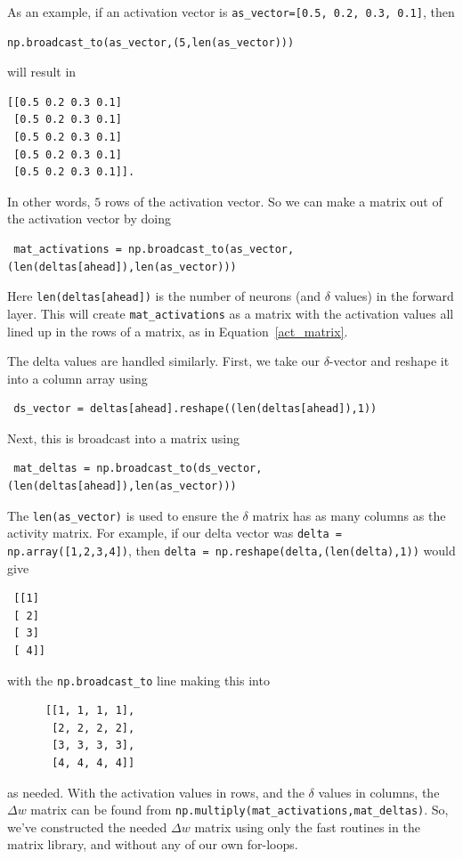 \documentclass[12pt]{article}
\begin{document}
As an example, if an activation vector is \verb|as_vector=[0.5, 0.2, 0.3, 0.1]|, then 
\begin{verbatim}
np.broadcast_to(as_vector,(5,len(as_vector)))
\end{verbatim}
will result in

\begin{verbatim}
[[0.5 0.2 0.3 0.1]
 [0.5 0.2 0.3 0.1]
 [0.5 0.2 0.3 0.1]
 [0.5 0.2 0.3 0.1]
 [0.5 0.2 0.3 0.1]].
 \end{verbatim}
 In other words, $5$ rows of the activation vector.  So we can make a matrix out of the activation vector by doing
 \begin{verbatim}
 mat_activations = np.broadcast_to(as_vector,(len(deltas[ahead]),len(as_vector)))
 \end{verbatim}
Here \verb|len(deltas[ahead])| is the number of neurons (and $\delta$ values) in the forward layer.  This will create \verb|mat_activations| as a matrix with the activation values all lined up in the rows of a matrix, as in Equation~\ref{act_matrix}.
 
 The delta values are handled similarly.  First, we take our $\delta$-vector and reshape it into a column array using 
 
 \begin{verbatim}
 ds_vector = deltas[ahead].reshape((len(deltas[ahead]),1))
 \end{verbatim}
 Next, this is broadcast into a matrix using
 \begin{verbatim}
 mat_deltas = np.broadcast_to(ds_vector,(len(deltas[ahead]),len(as_vector)))
 \end{verbatim} 
 The \verb|len(as_vector)| is used to ensure the $\delta$ matrix has as many columns as the activity matrix.  For example, if our delta vector was {\tt delta = np.array([1,2,3,4])}, then {\tt delta = np.reshape(delta,(len(delta),1))} would give
 
 \begin{verbatim}
 [[1]
 [ 2]
 [ 3]
 [ 4]]
 \end{verbatim}
 with the \verb|np.broadcast_to| line making this into
 \begin{verbatim}
      [[1, 1, 1, 1],
       [2, 2, 2, 2],
       [3, 3, 3, 3],
       [4, 4, 4, 4]]
 \end{verbatim}
 as needed.  With the activation values in rows, and the $\delta$ values in columns, the $\Delta w$ matrix can be found from \verb|np.multiply(mat_activations,mat_deltas)|. So, we've constructed the needed $\Delta w$ matrix using only the fast routines in the matrix library, and without any of our own for-loops. 
 
\end{document}
